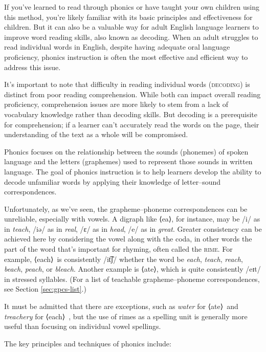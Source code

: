 If you've learned to read through phonics or have taught your own children using this method, you're likely familiar with its basic principles and effectiveness for children. But it can also be a valuable way for adult English language learners to improve word reading skills, also known as decoding. When an adult struggles to read individual words in English, despite having adequate oral language proficiency, phonics instruction is often the most effective and efficient way to address this issue.

It's important to note that difficulty in reading individual words (\textsc{decoding}) is distinct from poor reading comprehension. While both can impact overall reading proficiency, comprehension issues are more likely to stem from a lack of vocabulary knowledge rather than decoding skills. But decoding is a prerequisite for comprehension; if a learner can't accurately read the words on the page, their understanding of the text as a whole will be compromised.

Phonics focuses on the relationship between the sounds (phonemes) of spoken language and the letters (graphemes) used to represent those sounds in written language. The goal of phonics instruction is to help learners develop the ability to decode unfamiliar words by applying their knowledge of letter--sound correspondences.

Unfortunately, as we've seen, the grapheme--phoneme correspondences can be unreliable, especially with vowels. A digraph like ⟨ea⟩, for instance, may be /i/ as in \textit{teach}, /iə/ as in \textit{real}, /ɛ/ as in \textit{head}, /e/ as in \textit{great}. Greater consistency can be achieved here by considering the vowel along with the coda, in other words the part of the word that's important for rhyming, often called the \textsc{rime}. For example, ⟨each⟩~is consistently /it͡ʃ/ whether the word be \textit{each}, \textit{teach}, \textit{reach}, \textit{beach}, \textit{peach}, or \textit{bleach}. Another example is ⟨ate⟩, which is quite consistently /eɪt/ in stressed syllables. (For a list of teachable grapheme--phoneme correspondences, see Section \ref{sec:gpcs-list}.)

It must be admitted that there are exceptions, such as \textit{water} for ⟨ate⟩~and \textit{treachery} for ⟨each⟩~, but the use of rimes as a spelling unit is generally more useful than focusing on individual vowel spellings.

The key principles and techniques of phonics include:

